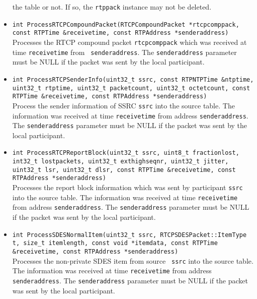 \documentclass[12pt,a4paper]{article}
\begin{document}
\begin{itemize}
						the table or not. If so, the {\tt rtppack} instance may not
						be deleted.
					\item {\tt int ProcessRTCPCompoundPacket(RTCPCompoundPacket *rtcpcomppack, const RTPTime \&receivetime,
					                                         const RTPAddress *senderaddress)}\\
						Processes the RTCP compound packet {\tt rtcpcomppack}
						which was received at time {\tt receivetime} from {\tt
						senderaddress}. The {\tt senderaddress} parameter must
						be NULL if the packet was sent by the local participant.
					\item {\tt int ProcessRTCPSenderInfo(uint32\_t ssrc, const RTPNTPTime \&ntptime, uint32\_t rtptime,
					                                     uint32\_t packetcount, uint32\_t octetcount, const RTPTime \&receivetime,
					                                     const RTPAddress *senderaddress)}\\
						Process the sender information of SSRC {\tt ssrc} into
						the source table. The information was received at time
						{\tt receivetime} from address {\tt senderaddress}. The
						{\tt senderaddress} parameter must be NULL if the packet
						was sent by the local participant.
					\item {\tt int ProcessRTCPReportBlock(uint32\_t ssrc, uint8\_t fractionlost, int32\_t lostpackets,
					                                      uint32\_t exthighseqnr, uint32\_t jitter, uint32\_t lsr,
					                                      uint32\_t dlsr, const RTPTime \&receivetime, const RTPAddress *senderaddress)}\\
						Processes the report block information which was sent
						by participant {\tt ssrc} into the source table. The
						information was received at time {\tt receivetime} from
						address {\tt senderaddress}. The {\tt senderaddress}
						parameter must be NULL if the packet was sent by the
						local participant.
					\item {\tt int ProcessSDESNormalItem(uint32\_t ssrc, RTCPSDESPacket::ItemType t, size\_t itemlength,
					                                     const void *itemdata, const RTPTime \&receivetime, const RTPAddress *senderaddress)}\\
						Processes the non-private SDES item from source {\tt
						ssrc} into the source table. The information was
						received at time {\tt receivetime} from address {\tt
						senderaddress}. The {\tt senderaddress} parameter must
						be NULL if the packet was sent by the local participant.

\end{itemize}
\end{document}
